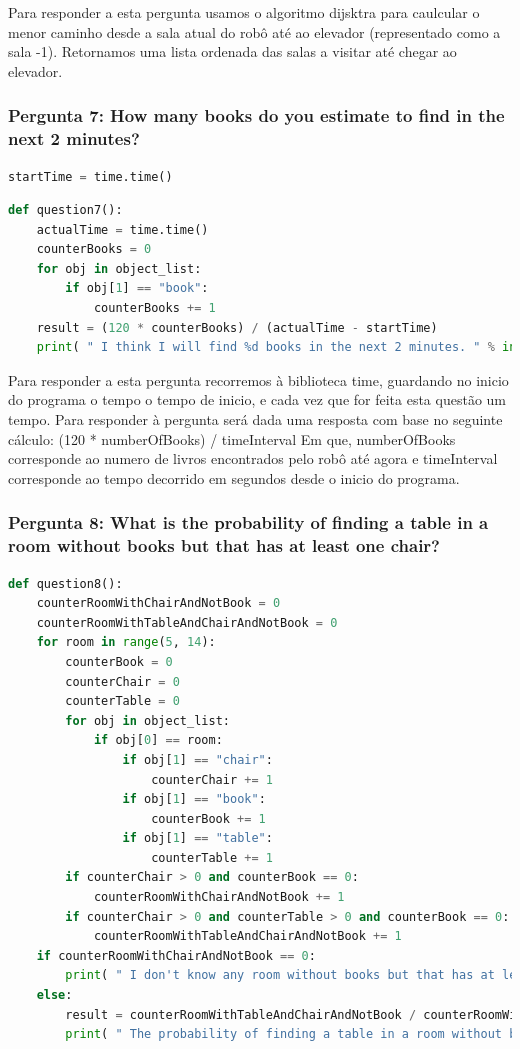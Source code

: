 \documentclass{article}
\begin{document}
Para responder a esta pergunta usamos o algoritmo dijsktra para caulcular o menor caminho desde a sala atual do robô até ao elevador (representado como a sala -1). Retornamos uma lista ordenada das salas a visitar até chegar ao elevador.

\subsubsection{Pergunta 7: How many books do you estimate to find in the next 2 minutes?}
\begin{lstlisting}[language=Python]
  startTime = time.time()
\end{lstlisting}
\begin{lstlisting}[language=Python]
  def question7():
	actualTime = time.time()
	counterBooks = 0
	for obj in object_list:
		if obj[1] == "book":
			counterBooks += 1
	result = (120 * counterBooks) / (actualTime - startTime)
	print( " I think I will find %d books in the next 2 minutes. " % int(result))
\end{lstlisting}

Para responder a esta pergunta recorremos à biblioteca time, guardando no inicio do programa o tempo o tempo de inicio, e cada vez que for feita esta questão um tempo. Para responder à pergunta será dada uma resposta com base no seguinte cálculo:
\newline (120 * numberOfBooks) / timeInterval
\newline Em que, numberOfBooks corresponde ao numero de livros encontrados pelo robô até agora e timeInterval corresponde ao tempo decorrido em segundos desde o inicio do programa.

\subsubsection{Pergunta 8: What is the probability of finding a table in a room without books but that
has at least one chair?}
\begin{lstlisting}[language=Python]
  def question8():
	counterRoomWithChairAndNotBook = 0
	counterRoomWithTableAndChairAndNotBook = 0
	for room in range(5, 14):
		counterBook = 0
		counterChair = 0
		counterTable = 0
		for obj in object_list:
			if obj[0] == room:
				if obj[1] == "chair":
					counterChair += 1
				if obj[1] == "book":
					counterBook += 1
				if obj[1] == "table":
					counterTable += 1
		if counterChair > 0 and counterBook == 0:
			counterRoomWithChairAndNotBook += 1
		if counterChair > 0 and counterTable > 0 and counterBook == 0:
			counterRoomWithTableAndChairAndNotBook += 1
	if counterRoomWithChairAndNotBook == 0:
		print( " I don't know any room without books but that has at least one chair yet. " )
	else:
		result = counterRoomWithTableAndChairAndNotBook / counterRoomWithChairAndNotBook
		print( " The probability of finding a table in a room without books but that has at least one chair is %d. " % result )
\end{lstlisting}
\end{document}

